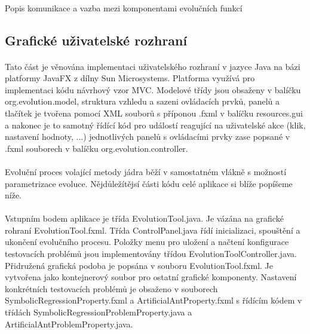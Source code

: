 \documentclass[bc,male,java,dept460]{diploma}		%
\begin{document}
\paragraph*{}
Popis komunikace a vazba mezi komponentami evolučních funkcí


\subsection{Grafické uživatelské rozhraní}
\paragraph*{}
Tato část je věnována implementaci uživatelského rozhraní v jazyce Java na bázi platformy JavaFX z dílny Sun Microsystems. Platforma využívá pro implementaci kódu návrhový vzor MVC. Modelové třídy jsou obsaženy v balíčku org.evolution.model, struktura vzhledu a sazeni ovládacích prvků, panelů a tlačítek je tvořena pomocí XML souborů s příponou .fxml v balíčku resources.gui a nakonec je to samotný řídící kód pro událostí reagující na uživatelské akce (klik, nastavení hodnoty, ...) jednotlivých panelů s ovládacími prvky zase popsané v .fxml souborech v balíčku org.evolution.controller. 


\paragraph*{}
Evoluční proces volající metody jádra běží v samostatném vlákně s možností parametrizace evoluce. Nějdůležítějsí části kódu celé aplikace si blíže popíšeme níže.

\paragraph*{}
Vstupním bodem aplikace je třída EvolutionTool.java. Je vázána na grafické rohraní EvolutionTool.fxml. Třída ControlPanel.java řídí inicializaci, spouštění a ukončení evolučního procesu. Položky menu pro uložení a načtení konfigurace testovacích problémů jsou implementovány třídou EvolutionToolController.java. Přidružená grafická podoba je popsána v souboru EvolutionTool.fxml. Je vytvořena jako kontejnerový soubor pro ostatní grafické komponenty. Nastavení konkrétních testovacích problémů je obsaženo v souborech SymbolicRegressionProperty.fxml a ArtificialAntProperty.fxml s řídícím kódem v třídách SymbolicRegressionProblemProperty.java a ArtificialAntProblemProperty.java.
\end{document}

